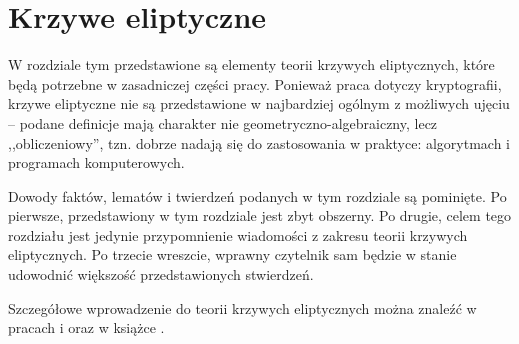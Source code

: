 \chapter{Krzywe eliptyczne}

W rozdziale tym przedstawione są elementy teorii krzywych eliptycznych,
które będą potrzebne w zasadniczej części pracy.
Ponieważ praca dotyczy kryptografii,
krzywe eliptyczne nie są przedstawione
w najbardziej ogólnym z możliwych ujęciu --
podane definicje mają charakter nie geometryczno-algebraiczny,
lecz ,,obliczeniowy'',
tzn. dobrze nadają się do zastosowania w praktyce:
algorytmach i programach komputerowych.

Dowody faktów, lematów i twierdzeń podanych w tym rozdziale są pominięte.
Po pierwsze, przedstawiony w tym rozdziale jest zbyt obszerny.
Po drugie, celem tego rozdziału jest jedynie przypomnienie wiadomości
z zakresu teorii krzywych eliptycznych.
Po trzecie wreszcie,
wprawny czytelnik sam będzie w stanie udowodnić
większość przedstawionych stwierdzeń.

Szczegółowe wprowadzenie do teorii krzywych eliptycznych
można znaleźć w pracach \cite{ecintro1} i \cite{ecintro2}
oraz w książce \cite{silverman}.






